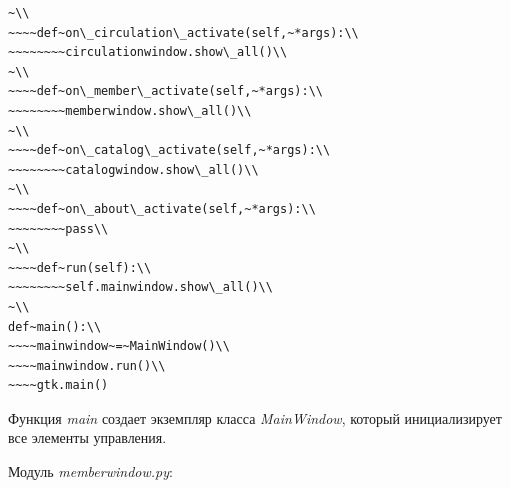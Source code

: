 \documentclass[a4paper,openany,twoside,draft]{book}
\providecommand*{\DUroletitlereference}[1]{\textsl{#1}}
\begin{document}
\begin{verbatim}
~\\
~~~~def~on\_circulation\_activate(self,~*args):\\
~~~~~~~~circulationwindow.show\_all()\\
~\\
~~~~def~on\_member\_activate(self,~*args):\\
~~~~~~~~memberwindow.show\_all()\\
~\\
~~~~def~on\_catalog\_activate(self,~*args):\\
~~~~~~~~catalogwindow.show\_all()\\
~\\
~~~~def~on\_about\_activate(self,~*args):\\
~~~~~~~~pass\\
~\\
~~~~def~run(self):\\
~~~~~~~~self.mainwindow.show\_all()\\
~\\
def~main():\\
~~~~mainwindow~=~MainWindow()\\
~~~~mainwindow.run()\\
~~~~gtk.main()
\end{verbatim}

Функция \DUroletitlereference{main} создает экземпляр класса \DUroletitlereference{MainWindow}, который
инициализирует все элементы управления.

Модуль \DUroletitlereference{memberwindow.py}:
\end{document}
